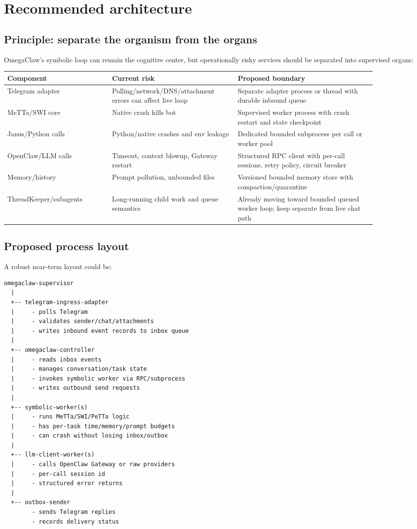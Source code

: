 \documentclass[11pt]{article}
\begin{document}
\section{Recommended architecture}

\subsection{Principle: separate the organism from the organs}

OmegaClaw's symbolic loop can remain the cognitive center, but operationally risky services should be separated into supervised organs:

\begin{center}
\begin{tabular}{p{0.25\linewidth} p{0.30\linewidth} p{0.33\linewidth}}
\toprule
Component & Current risk & Proposed boundary \\
\midrule
Telegram adapter & Polling/network/DNS/attachment errors can affect live loop & Separate adapter process or thread with durable inbound queue \\
MeTTa/SWI core & Native crash kills bot & Supervised worker process with crash restart and state checkpoint \\
Janus/Python calls & Python/native crashes and env leakage & Dedicated bounded subprocess per call or worker pool \\
OpenClaw/LLM calls & Timeout, context blowup, Gateway restart & Structured RPC client with per-call sessions, retry policy, circuit breaker \\
Memory/history & Prompt pollution, unbounded files & Versioned bounded memory store with compaction/quarantine \\
ThreadKeeper/subagents & Long-running child work and queue semantics & Already moving toward bounded queued worker loop; keep separate from live chat path \\
\bottomrule
\end{tabular}
\end{center}

\subsection{Proposed process layout}

A robust near-term layout could be:

\begin{Verbatim}[fontsize=\small]
omegaclaw-supervisor
  |
  +-- telegram-ingress-adapter
  |     - polls Telegram
  |     - validates sender/chat/attachments
  |     - writes inbound event records to inbox queue
  |
  +-- omegaclaw-controller
  |     - reads inbox events
  |     - manages conversation/task state
  |     - invokes symbolic worker via RPC/subprocess
  |     - writes outbound send requests
  |
  +-- symbolic-worker(s)
  |     - runs MeTTa/SWI/PeTTa logic
  |     - has per-task time/memory/prompt budgets
  |     - can crash without losing inbox/outbox
  |
  +-- llm-client-worker(s)
  |     - calls OpenClaw Gateway or raw providers
  |     - per-call session id
  |     - structured error returns
  |
  +-- outbox-sender
        - sends Telegram replies
        - records delivery status
\end{Verbatim}
\end{document}
